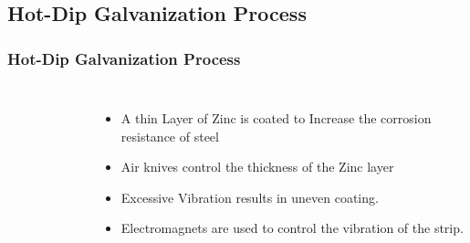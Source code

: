 \documentclass[9pt]{beamer}
\begin{document}
\subsection{Hot-Dip Galvanization Process}
\begin{frame}
\frametitle{Hot-Dip Galvanization Process}
\begin{figure}
\centering
{} \quad
\end{figure}
\end{frame}




\begin{frame}
\begin{columns}
\begin{figure}

\centering
{} 

\end{figure}
\begin{itemize}
\item A thin Layer of Zinc is coated to Increase the corrosion resistance of steel
\item Air knives control the thickness of the Zinc layer
\item Excessive Vibration results in uneven coating.
\item Electromagnets are used to control the  vibration of the strip. 
\end{itemize}
\end{columns}
\end{frame}
\end{document}
